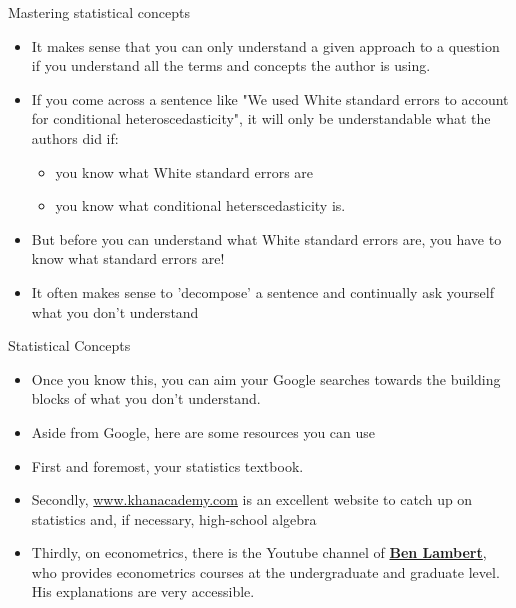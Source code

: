 \documentclass[aspectratio = 169, 12pt]{beamer}
\begin{document}
    \begin{frame}{Mastering statistical concepts}
        \begin{itemize}
            \item It makes sense that you can only understand a given approach to a question if you understand all the terms and concepts the author is using. 
            \item If you come across a sentence like "We used White standard errors to account for conditional heteroscedasticity", it will only be understandable what the authors did if:
                \begin{itemize}
                    \item you know what White standard errors are
                    \item you know what conditional heterscedasticity is. 
                \end{itemize}
            \item But before you can understand what White standard errors are, you have to know what standard errors are! 
            \item It often makes sense to 'decompose' a sentence and continually ask yourself what you don't understand
        \end{itemize}
    \end{frame}
    
    \begin{frame}{Statistical Concepts}
        \begin{itemize}
            \item Once you know this, you can aim your Google searches towards the building blocks of what you don't understand. 
            \item Aside from Google, here are some resources you can use
            \item First and foremost, your statistics textbook. 
            \item Secondly, \url{www.khanacademy.com} is an excellent website to catch up on statistics and, if necessary, high-school algebra
            \item Thirdly, on econometrics, there is the Youtube channel of \href{https://www.youtube.com/user/SpartacanUsuals}{\textbf{Ben Lambert}}, who provides econometrics courses at the undergraduate and graduate level. His explanations are very accessible. 
        \end{itemize}
    \end{frame}
    
\end{document}
